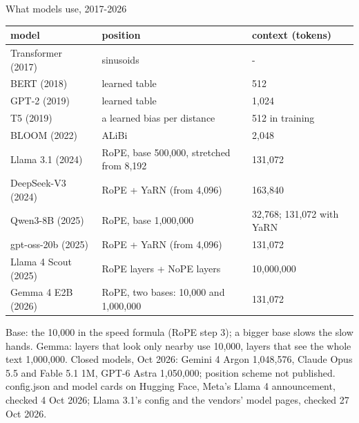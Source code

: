 \documentclass[aspectratio=169]{beamer}
\newcommand{\src}[1]{{\scriptsize\color{gray} #1}}
\begin{document}
\begin{frame}{What models use, 2017-2026}
  \footnotesize
  \begin{center}
  \begin{tabular}{lll}
    \textbf{model} & \textbf{position} & \textbf{context (tokens)} \\
    \hline
    Transformer (2017) & sinusoids & - \\
    BERT (2018) & learned table & 512 \\
    GPT-2 (2019) & learned table & 1,024 \\
    T5 (2019) & a learned bias per distance & 512 in training \\
    BLOOM (2022) & ALiBi & 2,048 \\
    Llama 3.1 (2024) & RoPE, base 500,000, stretched from 8,192 & 131,072 \\
    DeepSeek-V3 (2024) & RoPE + YaRN (from 4,096) & 163,840 \\
    Qwen3-8B (2025) & RoPE, base 1,000,000 & 32,768; 131,072 with YaRN \\
    gpt-oss-20b (2025) & RoPE + YaRN (from 4,096) & 131,072 \\
    Llama 4 Scout (2025) & RoPE layers + NoPE layers & 10,000,000 \\
    Gemma 4 E2B (2026) & RoPE, two bases: 10,000 and 1,000,000 & 131,072 \\
  \end{tabular}
  \end{center}
  \vskip 4pt
  {\footnotesize Base: the 10,000 in the speed formula (RoPE step 3); a bigger base slows the slow hands.
  Gemma: layers that look only nearby use 10,000, layers that see the whole text 1,000,000. Closed
  models, Oct 2026: Gemini 4 Argon 1,048,576, Claude Opus 5.5 and Fable 5.1 1M, GPT-6 Astra 1,050,000;
  position scheme not published.}
  \vskip 2pt
  \src{config.json and model cards on Hugging Face, Meta's Llama 4 announcement, checked 4 Oct
  2026; Llama 3.1's config and the vendors' model pages, checked 27 Oct 2026.}
\end{frame}
\end{document}

